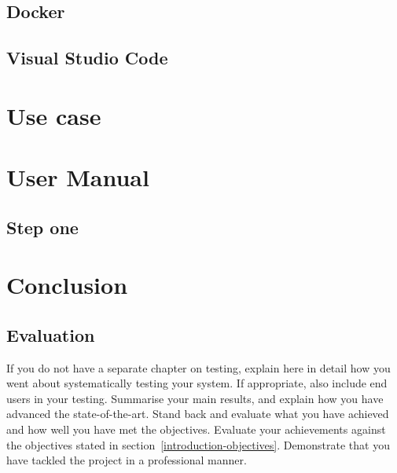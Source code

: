 \documentclass[a4paper,11pt]{report}
\begin{document}
\section{Docker}
\label{docker}

\section{Visual Studio Code}
\label{vsCode}
\chapter{Use case}
\label{usecase}


\chapter{User Manual}
\label{usermanual}

\section{Step one}
\label{stepOne}
	 


\chapter{Conclusion}

\label{conclusion}

\section{Evaluation}

\label{conclusion-evaluation}

If you do not have a separate chapter on testing, explain here in detail how you
went about systematically testing your system. If appropriate, also include
end users in your testing. Summarise your main results, and explain how you have
advanced the state-of-the-art. Stand back and evaluate what you have achieved
and how well you have met the objectives. Evaluate your achievements against the
objectives stated in section~\ref{introduction-objectives}. Demonstrate that you
have tackled the project in a professional manner.
\end{document}
